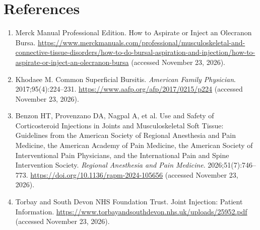 \section*{References}
\begin{enumerate}
  \item Merck Manual Professional Edition. How to Aspirate or Inject an Olecranon Bursa. \url{https://www.merckmanuals.com/professional/musculoskeletal-and-connective-tissue-disorders/how-to-do-bursal-aspiration-and-injection/how-to-aspirate-or-inject-an-olecranon-bursa} (accessed November 23, 2026).
  \item Khodaee M. Common Superficial Bursitis. \textit{American Family Physician}. 2017;95(4):224--231. \url{https://www.aafp.org/afp/2017/0215/p224} (accessed November 23, 2026).
  \item Benzon HT, Provenzano DA, Nagpal A, et al. Use and Safety of Corticosteroid Injections in Joints and Musculoskeletal Soft Tissue: Guidelines from the American Society of Regional Anesthesia and Pain Medicine, the American Academy of Pain Medicine, the American Society of Interventional Pain Physicians, and the International Pain and Spine Intervention Society. \textit{Regional Anesthesia and Pain Medicine}. 2026;51(7):746--773. \url{https://doi.org/10.1136/rapm-2024-105656} (accessed November 23, 2026).
  \item Torbay and South Devon NHS Foundation Trust. Joint Injection: Patient Information. \url{https://www.torbayandsouthdevon.nhs.uk/uploads/25952.pdf} (accessed November 23, 2026).
\end{enumerate}

\clearpage
